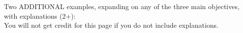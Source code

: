 \documentclass{article}
\theoremstyle{plain}
\theoremstyle{definition}
\theoremstyle{remark}
\begin{document}
\large \noindent Two ADDITIONAL examples, expanding on any of the three main objectives, with explanations (2+):\\
You will not get credit for this page if you do not include explanations.
%
%
\end{document}

